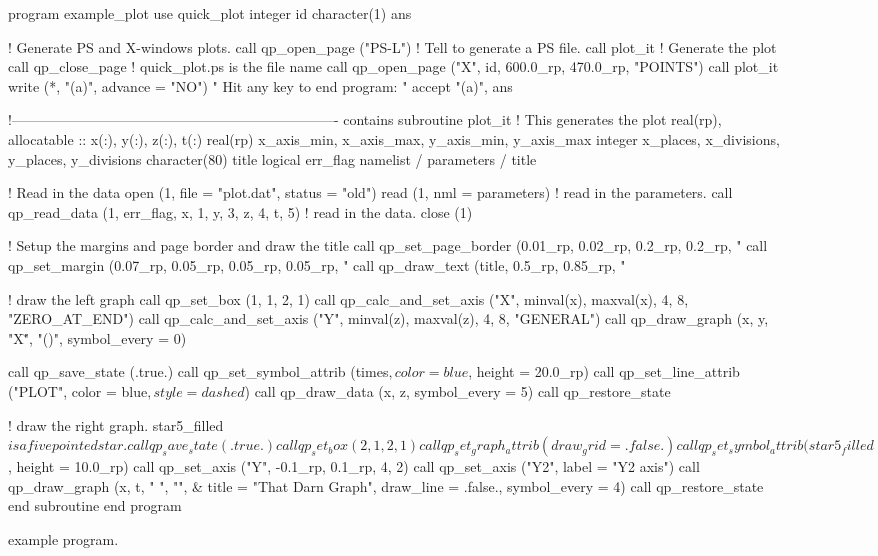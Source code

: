 \begin{figure}
\footnotesize
\begin{listing}{1}
  program example_plot
    use quick_plot
    integer id
    character(1) ans
  
  ! Generate PS and X-windows plots.
    call qp_open_page ("PS-L")  ! Tell \quickplot to generate a PS file.
    call plot_it              ! Generate the plot
    call qp_close_page        ! quick_plot.ps is the file name
    call qp_open_page ("X", id, 600.0_rp, 470.0_rp, "POINTS")
    call plot_it
    write (*, "(a)", advance = "NO") " Hit any key to end program: "
    accept "(a)", ans

  !----------------------------------------------------------------------
  contains
  subroutine plot_it                             ! This generates the plot
    real(rp), allocatable :: x(:), y(:), z(:), t(:)
    real(rp) x_axis_min, x_axis_max, y_axis_min, y_axis_max
    integer x_places, x_divisions, y_places, y_divisions
    character(80) title
    logical err_flag
    namelist / parameters / title

  ! Read in the data
    open (1, file = "plot.dat", status = "old")
    read (1, nml = parameters)                  ! read in the parameters.
    call qp_read_data (1, err_flag, x, 1, y, 3, z, 4, t, 5) ! read in the data.
    close (1)

  ! Setup the margins and page border and draw the title
    call qp_set_page_border (0.01_rp, 0.02_rp, 0.2_rp, 0.2_rp, "%
    call qp_set_margin (0.07_rp, 0.05_rp, 0.05_rp, 0.05_rp, "%
    call qp_draw_text (title, 0.5_rp, 0.85_rp, "%

  ! draw the left graph
    call qp_set_box (1, 1, 2, 1)
    call qp_calc_and_set_axis ("X", minval(x), maxval(x), 4, 8, "ZERO_AT_END")
    call qp_calc_and_set_axis ("Y", minval(z), maxval(z), 4, 8, "GENERAL")
    call qp_draw_graph (x, y, "X\dlab\u", "\gb(\A)", symbol_every = 0)

    call qp_save_state (.true.)
    call qp_set_symbol_attrib (times$, color = blue$, height = 20.0_rp)
    call qp_set_line_attrib ("PLOT", color = blue$, style = dashed$)
    call qp_draw_data (x, z, symbol_every = 5)
    call qp_restore_state

  ! draw the right graph. star5_filled$ is a five pointed star.
    call qp_save_state (.true.)
    call qp_set_box (2, 1, 2, 1)
    call qp_set_graph_attrib (draw_grid = .false.)
    call qp_set_symbol_attrib (star5_filled$, height = 10.0_rp)
    call qp_set_axis ("Y", -0.1_rp, 0.1_rp, 4, 2)
    call qp_set_axis ("Y2", label = "Y2 axis")
    call qp_draw_graph (x, t, "      ", "\fsLY\fn", &
             title = "That Darn Graph", draw_line = .false., symbol_every = 4)
    call qp_restore_state
  end subroutine
  end program
\end{listing}
\caption{\quickplot example program.}
\label{f:plot_example}
\end{figure}


